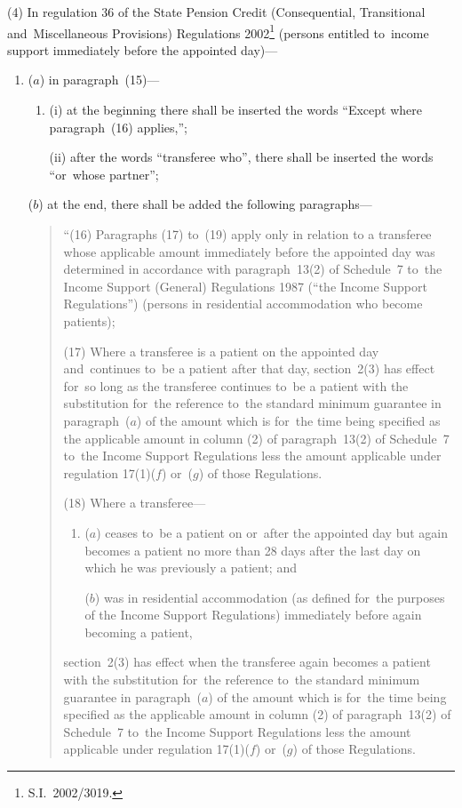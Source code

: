 \documentclass[12pt,a4paper]{article}
\begin{document}
(4) In regulation 36 of the State Pension Credit (Consequential, Transitional and~Miscellaneous Provisions) Regulations 2002\footnote{S.I.~2002/3019.} (persons entitled to~income support immediately before the appointed day)—
\begin{enumerate}\item[]
($a$) in paragraph~(15)—
\begin{enumerate}\item[]
(i) at the beginning there shall be inserted the words “Except where paragraph~(16) applies,”;

(ii) after the words “transferee who”, there shall be inserted the words “or~whose partner”;
\end{enumerate}

($b$) at the end, there shall be added the following paragraphs—
\begin{quotation}
“(16) Paragraphs (17) to~(19) apply only in relation to a transferee whose applicable amount immediately before the appointed day was determined in accordance with paragraph~13(2) of Schedule~7 to~the Income Support (General) Regulations 1987 (“the Income Support Regulations”) (persons in residential accommodation who become patients);

(17) Where a transferee is a patient on the appointed day and~continues to~be a patient after that day, section~2(3) has effect for~so long as the transferee continues to~be a patient with the substitution for~the reference to~the standard minimum guarantee in paragraph~($a$)  of the amount which is for~the time being specified as the applicable amount in column (2) of paragraph~13(2) of Schedule~7 to~the Income Support Regulations less the amount applicable under regulation 17(1)($f$)  or~($g$)  of those Regulations.

(18) Where a transferee—
\begin{enumerate}\item[]
($a$) ceases to~be a patient on or~after the appointed day but again becomes a patient no more than 28 days after the last day on which he was previously a patient; and

($b$) was in residential accommodation (as defined for~the purposes of the Income Support Regulations) immediately before again becoming a patient,
\end{enumerate}
section~2(3) has effect when the transferee again becomes a patient with the substitution for~the reference to~the standard minimum guarantee in paragraph~($a$)  of the amount which is for~the time being specified as the applicable amount in column (2) of paragraph~13(2) of Schedule~7 to~the Income Support Regulations less the amount applicable under regulation 17(1)($f$)  or~($g$)  of those Regulations.


\end{quotation}
\end{enumerate}
\end{document}
